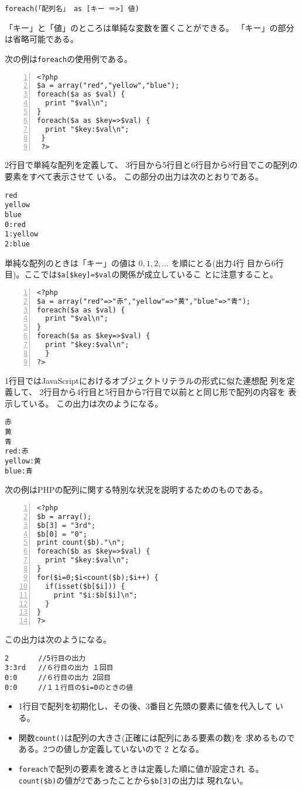\texttt{foreach(「配列名」 as [キー ＝>] 値)}

「キー」と「値」のところは単純な変数を置くことができる。
「キー」の部分は省略可能である。
\begin{Exec}\upshape
 次の例は\texttt{foreach}の使用例である。
\begin{Verbatim}[numbers=left]
 <?php
$a = array("red","yellow","blue");
foreach($a as $val) {
  print "$val\n";
}
foreach($a as $key=>$val) {
  print "$key:$val\n";
 }
 ?>
\end{Verbatim}
 2行目で単純な配列を定義して、
 3行目から5行目と6行目から8行目でこの配列の要素をすべて表示させて
       いる。
この部分の出力は次のとおりである。
\begin{verbatim}
red
yellow
blue
0:red
1:yellow
2:blue
\end{verbatim}
 単純な配列のときは「キー」の値は $0,1,2,\dots$ を順にとる(出力4行
       目から6行目)。ここでは\Verb+$a[$key]=$val+の関係が成立しているこ
       とに注意すること。
 \begin{Verbatim}[numbers=left]
<?php
$a = array("red"=>"赤","yellow"=>"黄","blue"=>"青");
foreach($a as $val) {
  print "$val\n";
}
foreach($a as $key=>$val) {
  print "$key:$val\n";
  }
?>
\end{Verbatim}
 1行目ではJavaScriptにおけるオブジェクトリテラルの形式に似た連想配
       列を定義して、 2行目から4行目と5行目から7行目で以前とと同じ形で配列の内容を
       表示している。
この出力は次のようになる。
\begin{Verbatim}
赤
黄
青
red:赤
yellow:黄
blue:青
\end{Verbatim}
\end{Exec}%
\begin{Exec}\upshape
次の例はPHPの配列に関する特別な状況を説明するためのものである。
\begin{Verbatim}[numbers=left]
<?php
$b = array();
$b[3] = "3rd";
$b[0] = "0";
print count($b)."\n";
foreach($b as $key=>$val) {
  print "$key:$val\n";
}
for($i=0;$i<count($b);$i++) {
  if(isset($b[$i])) {
    print "$i:$b[$i]\n";
  }
}
?>
\end{Verbatim}
この出力は次のようになる。%
\begin{Verbatim}
2       //5行目の出力
3:3rd   //６行目の出力 １回目
0:0     //６行目の出力 2回目
0:0     //１１行目の$i=0のときの値
\end{Verbatim}
\begin{itemize}\upshape
 \item 1行目で配列を初期化し、その後、$3$番目と先頭の要素に値を代入して
       いる。
 \item 関数\texttt{count()}は配列の大きさ(正確には配列にある要素の数)を
       求めるものである。2つの値しか定義していないので $2$ となる。
 \item \texttt{foreach}で配列の要素を渡るときは定義した順に値が設定され
       る。\Verb+count($b)+の値が$2$であったことから\Verb+$b[3]+の出力は
       現れない。
\end{itemize}
 \end{Exec}
